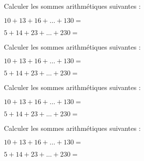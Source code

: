 \documentclass{exos}
\begin{document}
\begin{exercize*}
Calculer les sommes arithmétiques suivantes :
\begin{alphaquestions}
\item $10 + 13 + 16 + \dots + 130 =$
\item $5 + 14 + 23 + \dots + 230 =$
\end{alphaquestions}
\end{exercize*}
\vspace*{2cm}
\begin{exercize*}
Calculer les sommes arithmétiques suivantes :
\begin{alphaquestions}
\item $10 + 13 + 16 + \dots + 130 =$
\item $5 + 14 + 23 + \dots + 230 =$
\end{alphaquestions}
\end{exercize*}
\vspace*{2cm}
\begin{exercize*}
Calculer les sommes arithmétiques suivantes :
\begin{alphaquestions}
\item $10 + 13 + 16 + \dots + 130 =$
\item $5 + 14 + 23 + \dots + 230 =$
\end{alphaquestions}
\end{exercize*}
\vspace*{2cm}
\begin{exercize*}
Calculer les sommes arithmétiques suivantes :
\begin{alphaquestions}
\item $10 + 13 + 16 + \dots + 130 =$
\item $5 + 14 + 23 + \dots + 230 =$
\end{alphaquestions}
\end{exercize*}
\vspace*{2cm}
\end{document}
